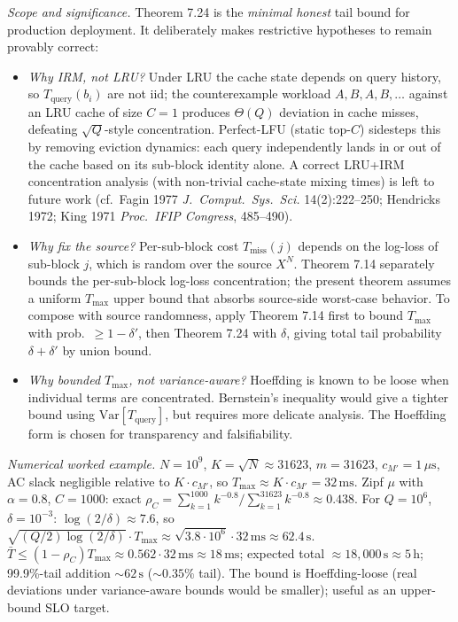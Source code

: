 \documentclass[
]{article}
\begin{document}
\emph{Scope and significance.}
Theorem 7.24 is the \emph{minimal honest} tail bound for production
deployment. It deliberately makes restrictive hypotheses to remain
provably correct:
\begin{itemize}
\item \emph{Why IRM, not LRU?} Under LRU the cache state depends on
query history, so $T_{\mathrm{query}}(b_i)$ are not iid; the
counterexample workload $A, B, A, B, \ldots$ against an LRU cache of
size $C = 1$ produces $\Theta(Q)$ deviation in cache misses, defeating
$\sqrt{Q}$-style concentration. Perfect-LFU (static top-$C$) sidesteps
this by removing eviction dynamics: each query independently lands in
or out of the cache based on its sub-block identity alone. A correct
LRU+IRM concentration analysis (with non-trivial cache-state mixing
times) is left to future work (cf.\ Fagin 1977 \emph{J.\ Comput.\ Sys.\ Sci.}
14(2):222--250; Hendricks 1972; King 1971 \emph{Proc.\ IFIP Congress}, 485--490).
\item \emph{Why fix the source?} Per-sub-block cost
$T_{\mathrm{miss}}(j)$ depends on the log-loss of sub-block $j$, which
is random over the source $X^N$. Theorem 7.14 separately bounds the
per-sub-block log-loss concentration; the present theorem assumes a
uniform $T_{\max}$ upper bound that absorbs source-side worst-case
behavior. To compose with source randomness, apply Theorem 7.14 first
to bound $T_{\max}$ with prob.\ $\geq 1 - \delta'$, then Theorem 7.24
with $\delta$, giving total tail probability $\delta + \delta'$ by
union bound.
\item \emph{Why bounded $T_{\max}$, not variance-aware?} Hoeffding is
known to be loose when individual terms are concentrated. Bernstein's
inequality would give a tighter bound using
$\mathrm{Var}[T_{\mathrm{query}}]$, but requires more delicate
analysis. The Hoeffding form is chosen for transparency and
falsifiability.
\end{itemize}

\emph{Numerical worked example.}
$N = 10^9$, $K = \sqrt{N} \approx 31623$, $m = 31623$, $c_{M'} =
1\,\mu\mathrm{s}$, AC slack negligible relative to $K \cdot c_{M'}$,
so $T_{\max} \approx K \cdot c_{M'} = 32\,\mathrm{ms}$. Zipf $\mu$
with $\alpha = 0.8$, $C = 1000$: exact $\rho_C = \sum_{k=1}^{1000}
k^{-0.8} / \sum_{k=1}^{31623} k^{-0.8} \approx 0.438$. For
$Q = 10^6$, $\delta = 10^{-3}$: $\log(2/\delta) \approx 7.6$, so
$\sqrt{(Q/2)\log(2/\delta)} \cdot T_{\max} \approx \sqrt{3.8 \cdot 10^6}
\cdot 32\,\mathrm{ms} \approx 62.4\,\mathrm{s}$.
$\bar{T} \leq (1-\rho_C) T_{\max} \approx 0.562 \cdot 32\,\mathrm{ms}
\approx 18\,\mathrm{ms}$; expected total $\approx 18{,}000\,\mathrm{s}
\approx 5\,\mathrm{h}$; 99.9\%-tail addition $\sim 62\,\mathrm{s}$
($\sim 0.35\%$ tail). The bound is Hoeffding-loose (real
deviations under variance-aware bounds would be smaller); useful as
an upper-bound SLO target.
\end{document}
